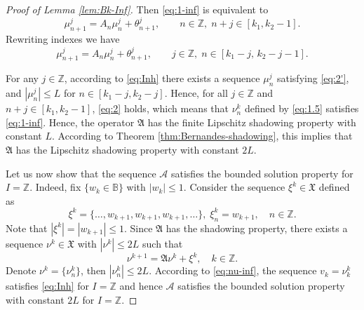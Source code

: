\documentclass[12pt]{article}
\newcommand{\Bb}{\mathbb{B}}
\newcommand{\Zz}{\mathbb{Z}}
\newcommand{\Aop}{\mathfrak{A}}
\newcommand{\Xop}{\mathfrak{X}}
\theoremstyle{definition}
\begin{document}
\begin{proof}[Proof of Lemma \ref{lem:Bk-Inf}]
Then \eqref{eq:1-inf} is equivalent to
\begin{equation}\label{eq:2}
  \mu_{n+1}^j = A_n\mu_n^j+\theta_{n+1}^j,\qquad n\in\Zz,\; n+j\in[k_1,k_2-1].
\end{equation}
Rewriting indexes we have
\begin{equation}\label{eq:2'}
  \mu_{n+1}^j = A_n\mu_n^j+\theta_{n+1}^j,\qquad j\in\Zz,\; n\in[k_1-j,\,k_2-j-1].
\end{equation}

For any $j\in\Zz$, according to \eqref{eq:Inh} there exists a sequence $\mu^j_n$ satisfying \eqref{eq:2'}, and $|\mu_n^j| \le L$ for $n\in[k_1-j,k_2-j]$.
Hence, for all $j\in\Zz$ and $n+j\in[k_1,k_2-1]$, \eqref{eq:2} holds, which means that $\nu_n^k$ defined by \eqref{eq:1.5} satisfies \eqref{eq:1-inf}. Hence, the operator $\Aop$ has the finite Lipschitz  shadowing property with constant $L$. According to Theorem \ref{thm:Bernandes-shadowing}, this implies that $\Aop$ has the Lipschitz shadowing property with constant $2L$.

Let us now show that the sequence $\mathcal{A}$ satisfies the bounded solution property for $I = \Zz$. Indeed, fix $\{w_k \in \Bb\}$ with $|w_k| \leq 1$. Consider the sequence $\xi^k \in \Xop$ defined as 
$$
\xi^k = \{ \dots, w_{k+1}, w_{k+1}, w_{k+1}, \dots\}, \; \xi^k_n = w_{k+1}, \quad n\in \Zz.
$$
Note that $|\xi^k| = |w_{k+1}| \leq 1$. Since $\Aop$ has the shadowing property, there exists a sequence $\nu^k \in \Xop$ with $|\nu^k| \leq 2L$ such that
\begin{equation}\label{eq:nu-inf}
  \nu^{k+1}=\Aop\nu^k+\xi^k,\quad k \in \Zz.
\end{equation}
Denote $\nu^k = \{\nu^k_n\}$, then $|\nu^k_n| \leq 2L$. According to \eqref{eq:nu-inf}, the sequence  $v_k = \nu^k_k$ satisfies \eqref{eq:Inh} for $I = \Zz$ and hence $\mathcal{A}$ satisfies the bounded solution property with constant $2L$ for $I = \Zz$.
\end{proof}
\end{document}
